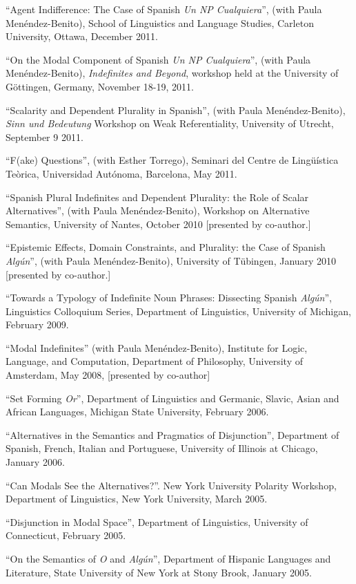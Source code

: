 \documentclass[11pt]{article}
\begin{document}
``Agent Indifference: The Case of Spanish \textit{Un NP
  Cualquiera}'', (with Paula Men\'endez-Benito), School of Linguistics and Language Studies, Carleton
University, Ottawa, December 2011. 

``On the Modal Component of Spanish \textit{Un NP
  Cualquiera}'', (with Paula Men\'endez-Benito), \textit{Indefinites
  and Beyond}, workshop held at the University of G\"{o}ttingen,
Germany, November 18-19, 2011.

``Scalarity and Dependent Plurality in Spanish'',
(with Paula Men\'endez-Benito), \textit{Sinn und Bedeutung} Workshop
on Weak Referentiality, University of Utrecht, September 9 2011.

``F(ake) Questions'', (with Esther Torrego), Seminari del
Centre de Ling\"{u}\'istica Te\`orica, Universidad Aut\'onoma, Barcelona, May 2011. 

``Spanish Plural Indefinites and Dependent Plurality:
the Role of Scalar Alternatives'', (with Paula Men\'endez-Benito),
Workshop on Alternative Semantics, University of Nantes, October 2010 [presented by co-author.]

``Epistemic Effects, Domain Constraints, and Plurality: the Case
of Spanish \textit{Alg\'un}'', (with Paula Men\'endez-Benito),
University of T\"ubingen, January 2010 [presented by co-author.]


``Towards a Typology of Indefinite Noun Phrases: Dissecting Spanish \textit{Alg\'un}'', Linguistics Colloquium Series, Department of Linguistics, University of Michigan, February 2009. 

``Modal Indefinites'' (with Paula Men\'endez-Benito),  Institute for Logic, Language, and Computation, Department of Philosophy, University of
  Amsterdam, May 2008, [presented by co-author]

``Set Forming \textit{Or}'', Department of Linguistics and Germanic, Slavic, Asian and African Languages, Michigan State University, February 2006.

``Alternatives in the Semantics and Pragmatics of Disjunction'', Department of Spanish, French, Italian and Portuguese, University of Illinois at Chicago, January 2006. 

``Can Modals See the Alternatives?''. New York University Polarity Workshop, Department of Linguistics, New York University, March 2005. 

``Disjunction in Modal Space'', Department of Linguistics, University of Connecticut, February 2005. 


``On the Semantics of \textit{O} and \textit{Alg\'un}'', Department of Hispanic Languages and Literature, State University of New York at Stony Brook, January 2005. 
 
\end{document}
